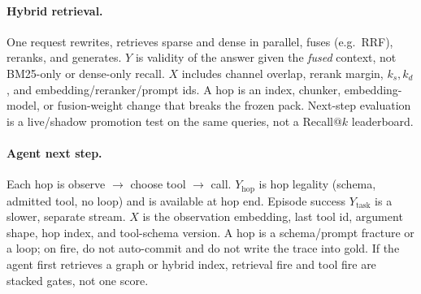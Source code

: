 \paragraph{Hybrid retrieval.}
One request rewrites, retrieves sparse and dense in parallel, fuses (e.g.\ RRF), reranks, and generates.
\(Y\) is validity of the answer given the \emph{fused} context, not BM25-only or dense-only recall.
\(X\) includes channel overlap, rerank margin, \(k_s,k_d\), and embedding/reranker/prompt ids.
A hop is an index, chunker, embedding-model, or fusion-weight change that breaks the frozen pack.
Next-step evaluation is a live/shadow promotion test on the same queries, not a Recall@\(k\) leaderboard.

\paragraph{Agent next step.}
Each hop is observe \(\to\) choose tool \(\to\) call.
\(Y_{\mathrm{hop}}\) is hop legality (schema, admitted tool, no loop) and is available at hop end.
Episode success \(Y_{\mathrm{task}}\) is a slower, separate stream.
\(X\) is the observation embedding, last tool id, argument shape, hop index, and tool-schema version.
A hop is a schema/prompt fracture or a loop; on fire, do not auto-commit and do not write the trace into gold.
If the agent first retrieves a graph or hybrid index, retrieval fire and tool fire are stacked gates, not one score.
